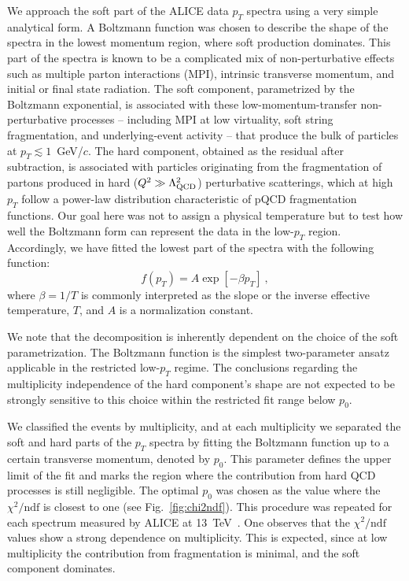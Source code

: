 \documentclass[pdflatex,sn-mathphys-num]{sn-jnl}%
\begin{document}
We approach the soft part of the ALICE data $p_T$ spectra using a very simple analytical form. A Boltzmann function was chosen to describe the shape of the spectra in the lowest momentum region, where soft production dominates. This part of the spectra is known to be a complicated mix of non-perturbative effects such as multiple parton interactions (MPI), intrinsic transverse momentum, and initial or final state radiation. The soft component, parametrized by the Boltzmann exponential, is associated with these low-momentum-transfer non-perturbative processes -- including MPI at low virtuality, soft string fragmentation, and underlying-event activity -- that produce the bulk of particles at $p_T \lesssim 1$~GeV/$c$. The hard component, obtained as the residual after subtraction, is associated with particles originating from the fragmentation of partons produced in hard ($Q^2 \gg \Lambda_{\rm QCD}^2$) perturbative scatterings, which at high $p_T$ follow a power-law distribution characteristic of pQCD fragmentation functions. Our goal here was not to assign a physical temperature but to test how well the Boltzmann form can represent the data in the low-$p_T$ region. Accordingly, we have fitted the lowest part of the spectra with the following function:
\begin{equation}
    f(p_T)=A\exp\left[-\beta p_T\right] \  ,
    \label{eq:boltzmann}
\end{equation}
%
where $\beta=1/T$ is commonly interpreted as the slope or the inverse effective temperature, $T$, and $A$ is a normalization constant.

We note that the decomposition is inherently dependent on the choice of the soft parametrization. The Boltzmann function is the simplest two-parameter ansatz applicable in the restricted low-$p_T$ regime. The conclusions regarding the multiplicity independence of the hard component's shape are not expected to be strongly sensitive to this choice within the restricted fit range below $p_0$.

We classified the events by multiplicity, and at each multiplicity we separated the soft and hard parts of the $p_T$ spectra by fitting the Boltzmann function up to a certain transverse momentum, denoted by $p_0$. This parameter defines the upper limit of the fit and marks the region where the contribution from hard QCD processes is still negligible. The optimal $p_0$ was chosen as the value where the $\chi^2/\text{ndf}$ is closest to one (see Fig.~\ref{fig:chi2ndf}). This procedure was repeated for each spectrum measured by ALICE at 13~TeV~\cite{ALICE:2020nkc}. One observes that the $\chi^2/\text{ndf}$ values show a strong dependence on multiplicity. This is expected, since at low multiplicity the contribution from fragmentation is minimal, and the soft component dominates.
\end{document}
